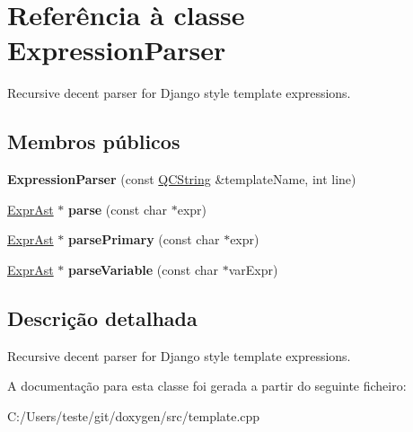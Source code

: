 \hypertarget{class_expression_parser}{\section{Referência à classe Expression\-Parser}
\label{class_expression_parser}
}


Recursive decent parser for Django style template expressions.  


\subsection*{Membros públicos}
\begin{DoxyCompactItemize}
\item 
\hypertarget{class_expression_parser_a21920276a86dbb84fa0509ed4b26e228}{{\bfseries Expression\-Parser} (const \hyperlink{class_q_c_string}{Q\-C\-String} \&template\-Name, int line)}\label{class_expression_parser_a21920276a86dbb84fa0509ed4b26e228}

\item 
\hypertarget{class_expression_parser_aad261b47c08ac7a2f335fc906a8f35de}{\hyperlink{class_expr_ast}{Expr\-Ast} $\ast$ {\bfseries parse} (const char $\ast$expr)}\label{class_expression_parser_aad261b47c08ac7a2f335fc906a8f35de}

\item 
\hypertarget{class_expression_parser_a6dfb2345cab0a40e734ae2a51cb64c1f}{\hyperlink{class_expr_ast}{Expr\-Ast} $\ast$ {\bfseries parse\-Primary} (const char $\ast$expr)}\label{class_expression_parser_a6dfb2345cab0a40e734ae2a51cb64c1f}

\item 
\hypertarget{class_expression_parser_a27b6b2fe606de24e0424d05405b28627}{\hyperlink{class_expr_ast}{Expr\-Ast} $\ast$ {\bfseries parse\-Variable} (const char $\ast$var\-Expr)}\label{class_expression_parser_a27b6b2fe606de24e0424d05405b28627}

\end{DoxyCompactItemize}


\subsection{Descrição detalhada}
Recursive decent parser for Django style template expressions. 

A documentação para esta classe foi gerada a partir do seguinte ficheiro\-:\begin{DoxyCompactItemize}
\item 
C\-:/\-Users/teste/git/doxygen/src/template.\-cpp\end{DoxyCompactItemize}
